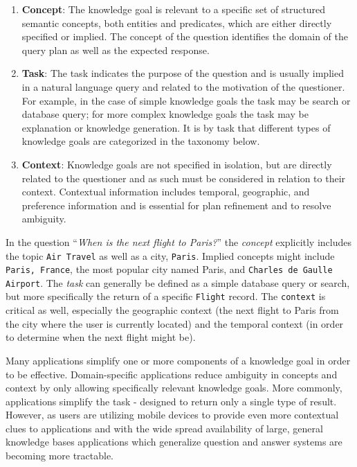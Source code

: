 \documentclass{llncs}
\begin{document}
\begin{enumerate}

\item \textbf{Concept}: The knowledge goal is relevant to a specific set of structured semantic concepts, both entities and predicates, which are either directly specified or implied. The concept of the question identifies the domain of the query plan as well as the expected response.

\item \textbf{Task}: The task indicates the purpose of the question and is usually implied in a natural language query and related to the motivation of the questioner. For example, in the case of simple knowledge goals the task may be search or database query; for more complex knowledge goals the task may be explanation or knowledge generation. It is by task that different types of knowledge goals are categorized in the taxonomy below.

\item \textbf{Context}: Knowledge goals are not specified in isolation, but are directly related to the questioner and as such must be considered in relation to their context. Contextual information includes temporal, geographic, and preference information and is essential for plan refinement and to resolve ambiguity.
\end{enumerate}

In the question ``\textit{When is the next flight to Paris?}'' the \textit{concept} explicitly includes the topic \texttt{Air Travel} as well as a city, \texttt{Paris}. Implied concepts might include \texttt{Paris, France}, the most popular city named Paris, and \texttt{Charles de Gaulle Airport}. The \textit{task} can generally be defined as a simple database query or search, but more specifically the return of a specific \texttt{Flight} record. The \texttt{context} is critical as well, especially the geographic context (the next flight to Paris from the city where the user is currently located) and the temporal context (in order to determine when the next flight might be).

Many applications simplify one or more components of a knowledge goal in order to be effective. Domain-specific applications reduce ambiguity in concepts and context by only allowing specifically relevant knowledge goals. More commonly, applications simplify the task - designed to return only a single type of result. However, as users are utilizing mobile devices to provide even more contextual clues to applications and with the wide spread availability of large, general knowledge bases applications which generalize question and answer systems are becoming more tractable.
\end{document}
